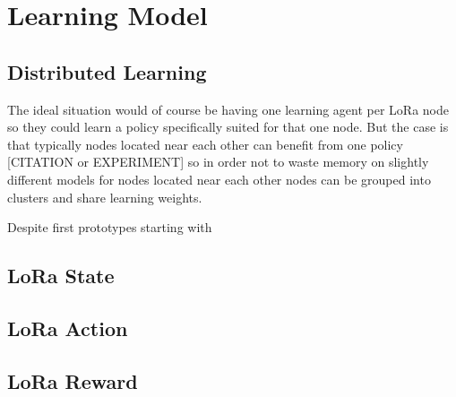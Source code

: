 
\chapter{Learning Model}
\section{Distributed Learning}

The ideal situation would of course be having one learning agent 
per LoRa node so they could learn a policy specifically suited for
that one node. But the case is that typically nodes located 
near each other can benefit from one policy [CITATION or EXPERIMENT]
so in order not to waste memory on slightly different models 
for nodes located near each other nodes can be grouped into clusters
and share learning weights.



Despite first prototypes starting with 

\section{LoRa State}
\section{LoRa Action}
\section{LoRa Reward}

